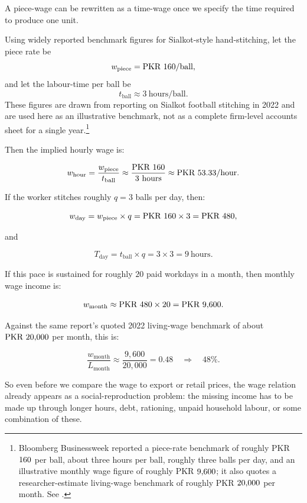 \begin{example}
\label{ex:sialkot-piecewage}

A piece-wage can be rewritten as a time-wage once we specify the time required
to produce one unit.

Using widely reported benchmark figures for Sialkot-style hand-stitching, let
the piece rate be
\[
w_{\text{piece}}=\text{PKR }160{}/\text{ball},
\]
and let the labour-time per ball be
\[
t_{\text{ball}}\approx 3\ \text{hours/ball}.
\]
These figures are drawn from reporting on Sialkot football stitching in 2022 and
are used here as an illustrative benchmark, not as a complete firm-level accounts
sheet for a single year.\footnote{Bloomberg Businessweek reported a piece-rate
benchmark of roughly PKR \(160{}\) per ball, about three hours per ball, roughly
three balls per day, and an illustrative monthly wage figure of roughly
PKR \(9{,}600{}\); it also quotes a researcher-estimate living-wage benchmark of
roughly PKR \(20{,}000{}\) per month. See \cite{Bloomberg2022Sialkot}.}

Then the implied hourly wage is:

\[
w_{\text{hour}}
=
\frac{w_{\text{piece}}}{t_{\text{ball}}}
\approx
\frac{\text{PKR }160{}}{3\ \text{hours}}
\approx
\text{PKR }53.33{}/\text{hour}.
\]

If the worker stitches roughly \(q=3\) balls per day, then:

\[
w_{\text{day}}
=
w_{\text{piece}}\times q
=
\text{PKR }160{} \times 3
=
\text{PKR }480,
\]

and

\[
T_{\text{day}}
=
t_{\text{ball}}\times q
=
3 \times 3
=
9\ \text{hours}.
\]

If this pace is sustained for roughly \(20\) paid workdays in a month, then
monthly wage income is:

\[
w_{\text{month}}
\approx
\text{PKR }480 \times 20
=
\text{PKR }9{,}600{}.
\]

Against the same report's quoted 2022 living-wage benchmark of about
\(\text{PKR }20{,}000{}\) per month, this is:

\[
\frac{w_{\text{month}}}{L_{\text{month}}}
\approx
\frac{9{,}600}{20{,}000}
=
0.48
\quad\Rightarrow\quad
48\%.
\]

So even before we compare the wage to export or retail prices, the wage relation
already appears as a social-reproduction problem: the missing income has to be
made up through longer hours, debt, rationing, unpaid household labour, or some
combination of these.


\end{example}
